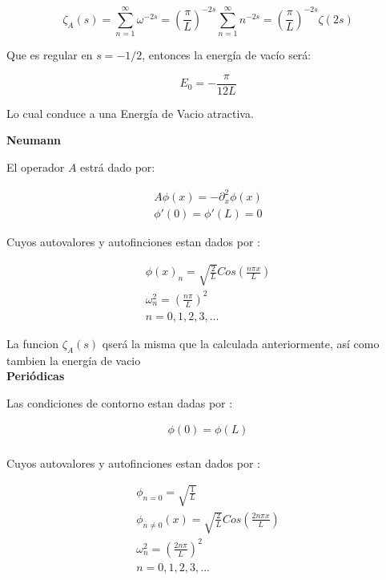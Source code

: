 \begin{equation}
\zeta _A (s) = 
\sum _{n=1} ^{\infty} \omega ^{-2s} =  
\left( \frac{\pi}{L} \right) ^{-2s} \sum _{n=1} ^{\infty} n ^{-2s} = 
\left( \frac{\pi}{L} \right) ^{-2s} \zeta (2s)
\end{equation}

Que es regular en $s=-1/2$, entonces la energía de vacío será:

\begin{equation}
E _0 = - \frac{\pi}{12 L}
\end{equation}

Lo cual conduce a una Energía de Vacio atractiva.

\textbf{Neumann}

El operador $A$ estrá dado por:

\begin{equation}
\begin{array}{c}
	A \phi (x) = - \partial _x ^2 \phi (x) \\
    \phi ' (0) = \phi ' (L) = 0 
\end{array}
\end{equation}



Cuyos autovalores y autofinciones estan dados por  : 

\begin{equation}
\begin{array}{c}
	\phi (x) _n = \sqrt{\frac{2}{L}} Cos( \frac{n \pi x}{L} ) \\
	\omega _n ^2 = \left( \frac{n \pi }{L} \right) ^2 \\
	n = 0,1,2,3, ...
\end{array}
\end{equation}

La funcion $\zeta _A (s)$ qserá la misma que la calculada anteriormente, así como tambien la energía de vacio \\

\textbf{Periódicas}

Las condiciones de contorno estan dadas por : 

\begin{equation}
\begin{array}{c}
    \phi (0) = \phi (L)  \\ 
\end{array}
\end{equation}

Cuyos autovalores y autofinciones estan dados por  : 

\begin{equation}
\begin{array}{c}
	\phi _{n=0} = \sqrt{\frac{1}{L}} \\ 
	\phi _{n \neq 0 } (x) = \sqrt{\frac{2}{L}} Cos( \frac{2 n \pi x}{L} ) \\
	\omega _n ^2 = \left( \frac{2 n \pi }{L} \right) ^2 \\
	n = 0,1,2,3, ...
\end{array}
\end{equation}

